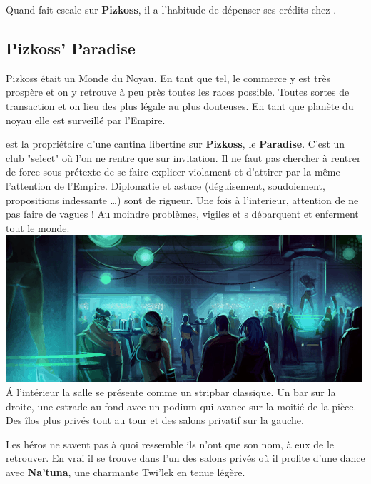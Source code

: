 Quand  fait escale sur \textbf{Pizkoss}, il a l’habitude de dépenser ses crédits chez .

\newpage
\subsection{Pizkoss’ Paradise}
Pizkoss était un Monde du Noyau. En tant que tel, le commerce y est très prospère et on y retrouve à peu près toutes les races possible. Toutes sortes de transaction et on lieu des plus légale au plus douteuses. En tant que planète du noyau elle est surveillé par l’Empire.

 est la propriétaire d’une cantina libertine sur \textbf{Pizkoss}, le \textbf{Paradise}. C’est un club "select" où l’on ne rentre que sur invitation. Il ne faut pas chercher à rentrer de force sous prétexte de se faire explicer violament et d’attirer par la même l’attention de l’Empire. Diplomatie et astuce (déguisement, soudoiement, propositions indessante \ldots) sont de rigueur. Une fois à l’interieur, attention de ne pas faire de vagues ! Au moindre problèmes, vigiles et s débarquent et enferment tout le monde.\\

\noindent\includegraphics[width=\linewidth]{_img/dos-au-muur/places/paradise-club.png}\\

\'A l’intérieur la salle se présente comme un stripbar classique. Un bar sur la droite, une estrade au fond avec un podium qui avance sur la moitié de la pièce. Des îlos plus privés tout au tour et des salons privatif sur la gauche. 

Les héros ne savent pas à quoi ressemble  ils n’ont que son nom, à eux de le retrouver. En vrai il se trouve dans l’un des salons privés où il profite d’une dance avec \textbf{Na’tuna}, une charmante Twi’lek en tenue légère.

